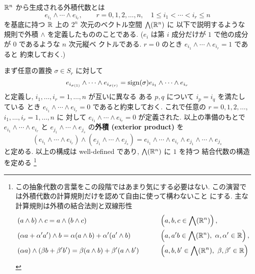 \documentclass[12pt,twoside]{jarticle}
\begin{document}
\begin{definition}[外積代数]
  \label{def:gaiseki-daisu}
  ${\mathbb R}^n$ から生成される外積代数とは
  \begin{equation*}
    e_{i_1}\wedge\cdots\wedge e_{i_r},
    \qquad
    r=0,1,2,\ldots,n,\quad 
    1\le i_1<\cdots<i_r\le n
    \tag{$*$}
  \end{equation*}
  を基底に持つ ${\mathbb R}$ 上の $2^n$ 次元のベクトル空間 $\bigwedge({\mathbb R}^n)$ に
  以下で説明するような規則で外積 $\wedge$ を定義したもののことである.
  ($e_i$ は第 $i$ 成分だけが $1$ で他の成分が $0$ であるような $n$ 次元縦ベ
  クトルである. $r=0$ のとき $e_{i_1}\wedge\cdots\wedge e_{i_r}=1$ であると
  約束しておく.)

  まず任意の置換 $\sigma\in S_r$ に対して
  \begin{equation*}
    e_{i_{\sigma(1)}}\wedge\cdots\wedge e_{i_{\sigma(r)}}
    = \mathop{\mathrm{sign}}\nolimits(\sigma)e_{i_1}\wedge\cdots\wedge e_{i_r}
  \end{equation*}
  と定義し, $i_1,\ldots,i_r=1,\ldots,n$ が互いに異なる
  ある $p,q$ について $i_p=i_q$ を満たしている
  とき $e_{i_1}\wedge\cdots\wedge e_{i_r}=0$ であると約束しておく.
  これで任意の $r=0,1,2,\ldots$, $i_1,\ldots,i_r=1,\ldots,n$ に
  対して $e_{i_1}\wedge\cdots\wedge e_{i_r}=0$ が定義された.
  以上の準備のもとで $e_{i_1}\wedge\cdots\wedge e_{i_r}$
  と $e_{j_1}\wedge\cdots\wedge e_{j_s}$ の{\bf 外積 (exterior product)} を
  \begin{equation*}
    (e_{i_1}\wedge\cdots\wedge e_{i_r})
    \wedge(e_{j_1}\wedge\cdots\wedge e_{j_s})
    = e_{i_1}\wedge\cdots\wedge e_{i_r}
    \wedge e_{j_1}\wedge\cdots\wedge e_{j_s}
  \end{equation*}
  と定める.  以上の構成は well-defined であり, $\bigwedge({\mathbb R}^n)$ に $1$ を持つ
  結合代数の構造を定める%
  \footnote{この抽象代数の言葉をこの段階ではあまり気にする必要はない.
    この演習では外積代数の計算規則だけを認めて自由に使って構わないこと
    にする. 主な計算規則は外積の結合法則と双線形性
    \begin{alignat*}{2}
      &
      (a\wedge b)\wedge c = a\wedge(b\wedge c)
      & \qquad &
      \left(a,b,c\in \bigwedge(\R^n)\right),
      \\ &
      (\alpha a + \alpha'a')\wedge b
      = \alpha (a\wedge b) + \alpha'(a'\wedge b)
      & \qquad &
      \left(a,a'b\in \bigwedge(\R^n),\ \alpha,\alpha'\in\R\right),
      \\ &
      (\alpha a)\wedge (\beta b+\beta'b')
      = \beta (a\wedge b) + \beta'(a\wedge b')
      & \qquad &
      \left(a,b,b'\in \bigwedge(\R^n),\ \beta,\beta'\in\R\right)

\end{alignat*}}
\end{definition}
\end{document}
